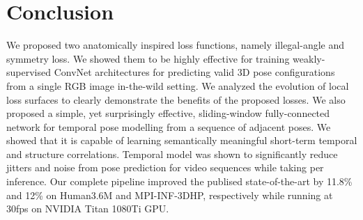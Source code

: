 \documentclass[runningheads]{llncs}
\begin{document}
\vspace{-02em}
\section{Conclusion}
\vspace{-1em}
We proposed two anatomically inspired loss functions, namely illegal-angle and symmetry loss. We showed them to be highly effective for training weakly-supervised ConvNet architectures for predicting valid 3D pose configurations from a single RGB image in-the-wild setting. We analyzed the evolution of local loss surfaces to clearly demonstrate the benefits of the proposed losses. We also proposed a simple, yet surprisingly effective, sliding-window fully-connected network for temporal pose modelling from a sequence of adjacent poses. We showed that it is capable of learning semantically meaningful short-term temporal and structure correlations. Temporal model was shown to significantly reduce jitters and noise from pose prediction for video sequences while taking  per inference. Our complete pipeline improved the publised state-of-the-art by 11.8\% and 12\% on Human3.6M and MPI-INF-3DHP, respectively while running at 30fps on NVIDIA Titan 1080Ti GPU.
\vspace{2.5em}

{
\small


}
\end{document}
